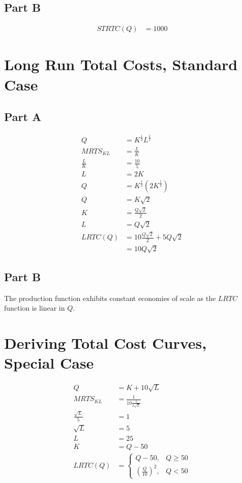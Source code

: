 \documentclass[8pt]{extarticle}
\begin{document}
{\subsection*{Part B}
\begin{align*}
	\label{eq:}
	STRTC(Q) &= \boxed{1000}
\end{align*}
\section{Long Run Total Costs, Standard Case}
\label{sec:Long Run Total Costs, Standard Case}
\subsection*{Part A}
\begin{align*}
	\label{eq:}
	Q &= K^{\frac{1}{2} }L^{\frac{1}{2} } \\
	MRTS_{KL} &= \frac{L}{K} \\
	\frac{L}{K} &= \frac{10}{5} \\
	L &= 2K \\
	Q &= K^{\frac{1}{2} }\left(2K^{\frac{1}{2} }\right) \\
	Q &= K\sqrt{2} \\
	K &= \frac{Q\sqrt{2}}{2} \\
	L &= Q\sqrt{2} \\
	LRTC(Q) &= 10\frac{Q\sqrt{2}}{2} + 5Q\sqrt{2} \\
	&= 10Q\sqrt{2}
\end{align*}
\subsection*{Part B}
The production function exhibits constant economies of scale as the $LRTC$ function is linear in $Q$.
\section{Deriving Total Cost Curves, Special Case}
\label{sec:Deriving Total Cost Curves, Special Case}
\begin{align*}
	\label{eq:}
	Q &= K + 10\sqrt{L} \\
	MRTS_{KL} &= \frac{1}{10\frac{1}{2\sqrt{L}}} \\
	\frac{\sqrt{L}}{5} &= 1 \\
	\sqrt{L} &= 5 \\
	L &= 25 \\
	K &= Q-50 \\
	LRTC(Q) &= \begin{cases}
		Q-50, & Q \geq 50 \\
		\left(\frac{Q}{10}\right)^2, & Q < 50
	\end{cases} 
\end{align*}
}
\end{document}
